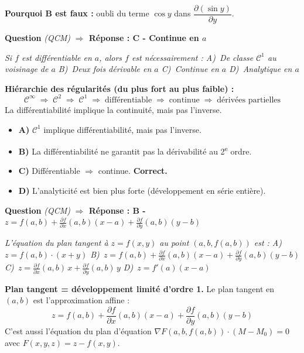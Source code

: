 \documentclass[11pt,a4paper]{article}
\newcounter{qnum}
\newcommand{\qtitre}[2]{%
  \stepcounter{qnum}%
  \medskip\noindent
  \textbf{\color{bleutexte}Question \theqnum}\enspace
  \textit{(#1)}\enspace
  \textcolor{vertok}{\textbf{$\Rightarrow$ Réponse : #2}}
  \par\smallskip
}
\newcommand{\qenonce}[1]{%
  \begin{mdframed}[backgroundcolor=grisbox, linewidth=0pt,
    innerleftmargin=8pt, innerrightmargin=8pt,
    innertopmargin=5pt, innerbottommargin=5pt,
    skipabove=2pt, skipbelow=4pt]
  \small\textit{#1}
  \end{mdframed}
}
\begin{document}
\textbf{Pourquoi B est faux :} oubli du terme $\cos y$ dans $\dfrac{\partial(\sin y)}{\partial y}$.

\qtitre{QCM}{C - Continue en $a$}
\qenonce{Si $f$ est différentiable en $a$, alors $f$ est nécessairement :
\quad A)~De classe $\mathcal{C}^1$ au voisinage de $a$
\quad B)~Deux fois dérivable en $a$
\quad C)~Continue en $a$
\quad D)~Analytique en $a$}

\begin{methodebox}
\textbf{Hiérarchie des régularités (du plus fort au plus faible) :}
$$\mathcal{C}^\infty \;\Rightarrow\; \mathcal{C}^2 \;\Rightarrow\; \mathcal{C}^1 \;\Rightarrow\; \text{différentiable} \;\Rightarrow\; \text{continue} \;\Rightarrow\; \text{dérivées partielles}$$
La différentiabilité implique la continuité, mais pas l'inverse.
\end{methodebox}

\begin{itemize}[leftmargin=1.5em, itemsep=2pt]
  \item \textcolor{rougeerr}{\textbf{A)}} $\mathcal{C}^1$ implique différentiabilité, mais pas l'inverse.
  \item \textcolor{rougeerr}{\textbf{B)}} La différentiabilité ne garantit pas la dérivabilité au 2\textsuperscript{e} ordre.
  \item \textcolor{vertok}{\textbf{C)}} Différentiable $\Rightarrow$ continue. \textbf{Correct.}
  \item \textcolor{rougeerr}{\textbf{D)}} L'analyticité est bien plus forte (développement en série entière).
\end{itemize}

\qtitre{QCM}{B - $z = f(a,b) + \frac{\partial f}{\partial x}(a,b)(x-a) + \frac{\partial f}{\partial y}(a,b)(y-b)$}
\qenonce{L'équation du plan tangent à $z=f(x,y)$ au point $(a,b,f(a,b))$ est :
\quad A)~$z = f(a,b)\cdot(x+y)$
\quad B)~$z = f(a,b) + \frac{\partial f}{\partial x}(a,b)(x-a) + \frac{\partial f}{\partial y}(a,b)(y-b)$
\quad C)~$z = \frac{\partial f}{\partial x}(a,b)\,x + \frac{\partial f}{\partial y}(a,b)\,y$
\quad D)~$z = f'(a)(x-a)$}

\begin{methodebox}
\textbf{Plan tangent = développement limité d'ordre 1.} Le plan tangent en $(a,b)$ est l'approximation affine :
$$z = f(a,b) + \frac{\partial f}{\partial x}(a,b)(x-a) + \frac{\partial f}{\partial y}(a,b)(y-b)$$
C'est aussi l'équation du plan d'équation $\nabla F(a,b,f(a,b))\cdot(M-M_0)=0$ avec $F(x,y,z) = z - f(x,y)$.
\end{methodebox}
\end{document}
